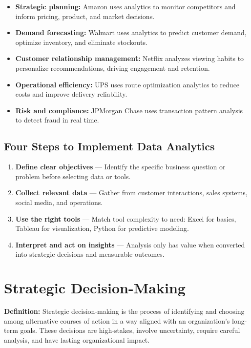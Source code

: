 \documentclass[11pt, letterpaper]{article}
\begin{document}
\begin{itemize}[leftmargin=*]
  \item \textbf{Strategic planning:} Amazon uses analytics to monitor competitors and inform pricing, product, and market decisions.
  \item \textbf{Demand forecasting:} Walmart uses analytics to predict customer demand, optimize inventory, and eliminate stockouts.
  \item \textbf{Customer relationship management:} Netflix analyzes viewing habits to personalize recommendations, driving engagement and retention.
  \item \textbf{Operational efficiency:} UPS uses route optimization analytics to reduce costs and improve delivery reliability.
  \item \textbf{Risk and compliance:} JPMorgan Chase uses transaction pattern analysis to detect fraud in real time.
\end{itemize}

\subsection{Four Steps to Implement Data Analytics}

\begin{enumerate}[leftmargin=*, label=\textbf{\arabic*.}]
  \item \textbf{Define clear objectives} --- Identify the specific business question or problem before selecting data or tools.
  \item \textbf{Collect relevant data} --- Gather from customer interactions, sales systems, social media, and operations.
  \item \textbf{Use the right tools} --- Match tool complexity to need: Excel for basics, Tableau for visualization, Python for predictive modeling.
  \item \textbf{Interpret and act on insights} --- Analysis only has value when converted into strategic decisions and measurable outcomes.
\end{enumerate}

\newpage

\section{Strategic Decision-Making}

\begin{defbox}
\textbf{Definition:} Strategic decision-making is the process of identifying and choosing among alternative courses of action in a way aligned with an organization's long-term goals. These decisions are high-stakes, involve uncertainty, require careful analysis, and have lasting organizational impact.
\end{defbox}
\end{document}
